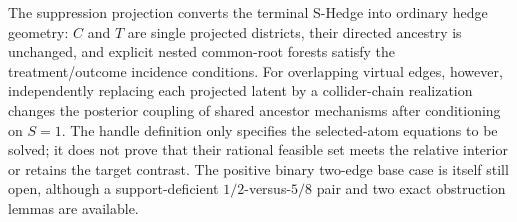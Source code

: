 The suppression projection converts the terminal S-Hedge into ordinary hedge geometry: \(C\) and \(T\) are single projected districts, their directed ancestry is unchanged, and explicit nested common-root forests satisfy the treatment/outcome incidence conditions. For overlapping virtual edges, however, independently replacing each projected latent by a collider-chain realization changes the posterior coupling of shared ancestor mechanisms after conditioning on \(S=1\). The handle definition only specifies the selected-atom equations to be solved; it does not prove that their rational feasible set meets the relative interior or retains the target contrast. The positive binary two-edge base case is itself still open, although a support-deficient \(1/2\)-versus-\(5/8\) pair and two exact obstruction lemmas are available.